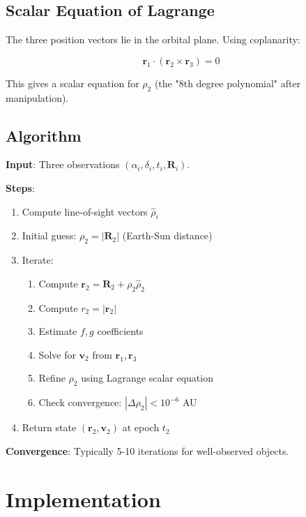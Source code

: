\subsection{Scalar Equation of Lagrange}

The three position vectors lie in the orbital plane. Using coplanarity:

\begin{equation}
    \mathbf{r}_1 \cdot (\mathbf{r}_2 \times \mathbf{r}_3) = 0
\end{equation}

This gives a scalar equation for $\rho_2$ (the "8th degree polynomial" after manipulation).

\subsection{Algorithm}

\textbf{Input}: Three observations $(\alpha_i, \delta_i, t_i, \mathbf{R}_i)$.

\textbf{Steps}:
\begin{enumerate}
    \item Compute line-of-sight vectors $\hat{\rho}_i$
    \item Initial guess: $\rho_2 = |\mathbf{R}_2|$ (Earth-Sun distance)
    \item Iterate:
    \begin{enumerate}
        \item Compute $\mathbf{r}_2 = \mathbf{R}_2 + \rho_2 \hat{\rho}_2$
        \item Compute $r_2 = |\mathbf{r}_2|$
        \item Estimate $f, g$ coefficients
        \item Solve for $\mathbf{v}_2$ from $\mathbf{r}_1, \mathbf{r}_3$
        \item Refine $\rho_2$ using Lagrange scalar equation
        \item Check convergence: $|\Delta\rho_2| < 10^{-6}$ AU
    \end{enumerate}
    \item Return state $(\mathbf{r}_2, \mathbf{v}_2)$ at epoch $t_2$
\end{enumerate}

\textbf{Convergence}: Typically 5-10 iterations for well-observed objects.

\section{Implementation}

